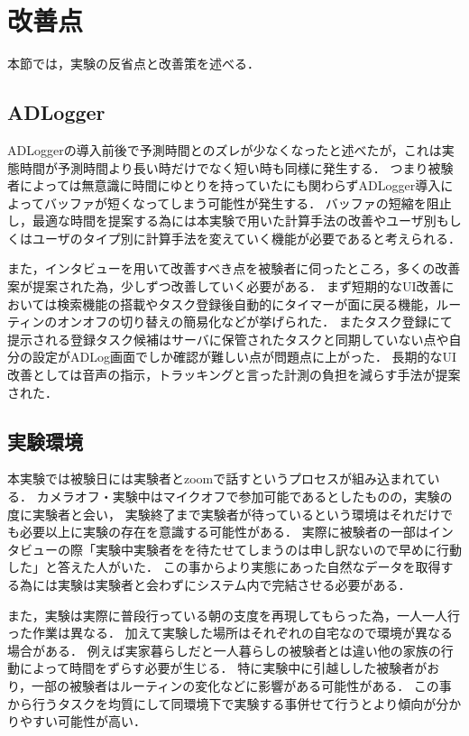\section{改善点}
本節では，実験の反省点と改善策を述べる．

\subsection{ADLogger}
ADLoggerの導入前後で予測時間とのズレが少なくなったと述べたが，これは実態時間が予測時間より長い時だけでなく短い時も同様に発生する．
つまり被験者によっては無意識に時間にゆとりを持っていたにも関わらずADLogger導入によってバッファが短くなってしまう可能性が発生する．
バッファの短縮を阻止し，最適な時間を提案する為には本実験で用いた計算手法の改善やユーザ別もしくはユーザのタイプ別に計算手法を変えていく機能が必要であると考えられる．

また，インタビューを用いて改善すべき点を被験者に伺ったところ，多くの改善案が提案された為，少しずつ改善していく必要がある．
まず短期的なUI改善においては検索機能の搭載やタスク登録後自動的にタイマーが面に戻る機能，ルーティンのオンオフの切り替えの簡易化などが挙げられた．
またタスク登録にて提示される登録タスク候補はサーバに保管されたタスクと同期していない点や自分の設定がADLog画面でしか確認が難しい点が問題点に上がった．
長期的なUI改善としては音声の指示，トラッキングと言った計測の負担を減らす手法が提案された．

\subsection{実験環境}
本実験では被験日には実験者とzoomで話すというプロセスが組み込まれている．
カメラオフ・実験中はマイクオフで参加可能であるとしたものの，実験の度に実験者と会い，
実験終了まで実験者が待っているという環境はそれだけでも必要以上に実験の存在を意識する可能性がある．
実際に被験者の一部はインタビューの際「実験中実験者をを待たせてしまうのは申し訳ないので早めに行動した」と答えた人がいた．
この事からより実態にあった自然なデータを取得する為には実験は実験者と会わずにシステム内で完結させる必要がある．

また，実験は実際に普段行っている朝の支度を再現してもらった為，一人一人行った作業は異なる．
加えて実験した場所はそれぞれの自宅なので環境が異なる場合がある．
例えば実家暮らしだと一人暮らしの被験者とは違い他の家族の行動によって時間をずらす必要が生じる．
特に実験中に引越しした被験者がおり，一部の被験者はルーティンの変化などに影響がある可能性がある．
この事から行うタスクを均質にして同環境下で実験する事併せて行うとより傾向が分かりやすい可能性が高い．

